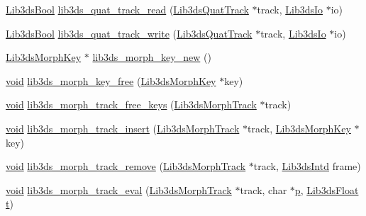 \begin{DoxyCompactItemize}
\item 
\hyperlink{types_8h_a89dd7398a9ebbbf28011f8c32df67ad3}{Lib3ds\-Bool} \hyperlink{group__tracks_gab6b3b2c0b9faa07eb654b6fc17c6d32d}{lib3ds\-\_\-quat\-\_\-track\-\_\-read} (\hyperlink{struct_lib3ds_quat_track}{Lib3ds\-Quat\-Track} $\ast$track, \hyperlink{struct_lib3ds_io}{Lib3ds\-Io} $\ast$io)
\item 
\hyperlink{types_8h_a89dd7398a9ebbbf28011f8c32df67ad3}{Lib3ds\-Bool} \hyperlink{group__tracks_gac35fc7c994fd90ed0ca28305a6ac8a8c}{lib3ds\-\_\-quat\-\_\-track\-\_\-write} (\hyperlink{struct_lib3ds_quat_track}{Lib3ds\-Quat\-Track} $\ast$track, \hyperlink{struct_lib3ds_io}{Lib3ds\-Io} $\ast$io)
\item 
\hyperlink{struct_lib3ds_morph_key}{Lib3ds\-Morph\-Key} $\ast$ \hyperlink{group__tracks_ga0cb08fbd64793b781ee14bd8942554cc}{lib3ds\-\_\-morph\-\_\-key\-\_\-new} ()
\item 
\hyperlink{group___u_a_v_objects_plugin_ga444cf2ff3f0ecbe028adce838d373f5c}{void} \hyperlink{group__tracks_ga88f49043dc2880d77e5df818e86b317a}{lib3ds\-\_\-morph\-\_\-key\-\_\-free} (\hyperlink{struct_lib3ds_morph_key}{Lib3ds\-Morph\-Key} $\ast$key)
\item 
\hyperlink{group___u_a_v_objects_plugin_ga444cf2ff3f0ecbe028adce838d373f5c}{void} \hyperlink{group__tracks_gaaf6ddcc7f3d892cb0a8d887d96decbba}{lib3ds\-\_\-morph\-\_\-track\-\_\-free\-\_\-keys} (\hyperlink{struct_lib3ds_morph_track}{Lib3ds\-Morph\-Track} $\ast$track)
\item 
\hyperlink{group___u_a_v_objects_plugin_ga444cf2ff3f0ecbe028adce838d373f5c}{void} \hyperlink{group__tracks_ga2da72a4823feb5c85e9deda863a0fcf1}{lib3ds\-\_\-morph\-\_\-track\-\_\-insert} (\hyperlink{struct_lib3ds_morph_track}{Lib3ds\-Morph\-Track} $\ast$track, \hyperlink{struct_lib3ds_morph_key}{Lib3ds\-Morph\-Key} $\ast$key)
\item 
\hyperlink{group___u_a_v_objects_plugin_ga444cf2ff3f0ecbe028adce838d373f5c}{void} \hyperlink{group__tracks_ga569b3c1cac16395196117739d298d91b}{lib3ds\-\_\-morph\-\_\-track\-\_\-remove} (\hyperlink{struct_lib3ds_morph_track}{Lib3ds\-Morph\-Track} $\ast$track, \hyperlink{types_8h_a5d92ad41149cf040ce2ee32cc2609403}{Lib3ds\-Intd} frame)
\item 
\hyperlink{group___u_a_v_objects_plugin_ga444cf2ff3f0ecbe028adce838d373f5c}{void} \hyperlink{group__tracks_ga8bddb614f3968b22b600bd2ab5174773}{lib3ds\-\_\-morph\-\_\-track\-\_\-eval} (\hyperlink{struct_lib3ds_morph_track}{Lib3ds\-Morph\-Track} $\ast$track, char $\ast$\hyperlink{glext_8h_aa5367c14d90f462230c2611b81b41d23}{p}, \hyperlink{types_8h_ab18e70f51f9a53c9dee8d930c8e1a7bf}{Lib3ds\-Float} \hyperlink{glext_8h_a00140d6f5c548b26daf170bf16e86a6d}{t})

\end{DoxyCompactItemize}
